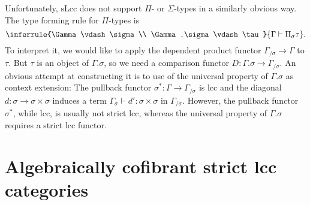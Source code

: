 \documentclass{article}
\begin{document}
Unfortunately, $\mathrm{sLcc}$ does not support $\Pi$- or $\Sigma$-types in a similarly obvious way.
The type forming rule for $\Pi$-types is
\begin{equation}
  \inferrule
  {\Gamma \vdash \sigma \\ \Gamma.\sigma \vdash \tau}
  {\Gamma \vdash \Pi_\sigma \tau}.
\end{equation}
To interpret it, we would like to apply the dependent product functor $\Gamma_{/ \sigma} \rightarrow \Gamma$ to $\tau$.
But $\tau$ is an object of $\Gamma.\sigma$, so we need a comparison functor $D : \Gamma.\sigma \rightarrow \Gamma_{/ \sigma}$.
An obvious attempt at constructing it is to use of the universal property of $\Gamma.\sigma$ as context extension:
The pullback functor $\sigma^* : \Gamma \rightarrow \Gamma_{/ \sigma}$ is lcc and the diagonal $d : \sigma \rightarrow \sigma \times \sigma$ induces a term $\Gamma_{\sigma} \vdash d' : \sigma \times \sigma$ in $\Gamma_{/ \sigma}$.
However, the pullback functor $\sigma^*$, while lcc, is usually not strict lcc, whereas the universal property of $\Gamma.\sigma$ requires a strict lcc functor.

\section{Algebraically cofibrant strict lcc categories}
\label{sec:algebraically-cofibrant}
\end{document}
